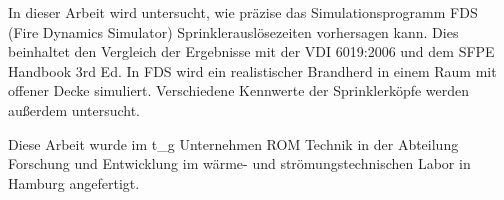 In dieser Arbeit wird untersucht, wie präzise das Simulationsprogramm FDS (Fire Dynamics Simulator) Sprinklerauslösezeiten vorhersagen kann. Dies beinhaltet den Vergleich der Ergebnisse mit der VDI 6019:2006 und dem SFPE Handbook 3rd Ed. In FDS wird ein realistischer Brandherd in einem Raum mit offener Decke simuliert. Verschiedene Kennwerte der Sprinklerköpfe werden außerdem untersucht. 

Diese Arbeit wurde im t_g Unternehmen ROM Technik in der Abteilung Forschung und Entwicklung im wärme- und strömungstechnischen Labor in Hamburg angefertigt.

